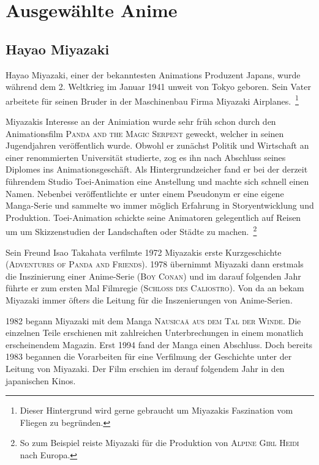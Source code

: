 \newpage
\section{Ausgewählte Anime}


\subsection{Hayao Miyazaki}
Hayao Miyazaki, einer der bekanntesten Animations Produzent Japans, wurde während dem 2. Weltkrieg im Januar 1941 unweit von Tokyo geboren. Sein Vater arbeitete für seinen Bruder in der Maschinenbau Firma Miyazaki Airplanes.~\footnote{Dieser Hintergrund wird gerne gebraucht um Miyazakis Faszination vom Fliegen zu begründen.} 

Miyazakis Interesse an der Animiation wurde sehr früh schon durch den Animationsfilm \textsc{Panda and the Magic Serpent} geweckt, welcher in seinen Jugendjahren veröffentlich wurde. Obwohl er zunächst Politik und Wirtschaft an einer renommierten Universität studierte, zog es ihn nach Abschluss seines Diplomes ins Animationsgeschäft. Als Hintergrundzeicher fand er bei der derzeit führendem Studio Toei-Animation eine Anstellung und machte sich schnell einen Namen. Nebenbei veröffentlichte er unter einem Pseudonym er eine eigene Manga-Serie und sammelte wo immer möglich Erfahrung in Storyentwicklung und Produktion. Toei-Animation schickte seine Animatoren gelegentlich auf Reisen um um Skizzenstudien der Landschaften oder Städte zu machen.~\footnote{So zum Beispiel reiste Miyazaki für die Produktion von \textsc{Alpine Girl Heidi} nach Europa.} 

Sein Freund Isao Takahata verfilmte 1972 Miyazakis erste Kurzgeschichte (\textsc{Adventures of Panda and Friends}). 1978 übernimmt Miyazaki dann erstmals die Inszinierung einer Anime-Serie (\textsc{Boy Conan}) und im darauf folgenden Jahr führte er zum ersten Mal Filmregie (\textsc{Schloss des Caliostro}). Von da an bekam Miyazaki immer öfters die Leitung für die Inszenierungen von Anime-Serien.

1982 begann Miyazaki mit dem Manga \textsc{Nausicaä aus dem Tal der Winde}. Die einzelnen Teile erschienen mit zahlreichen Unterbrechungen in einem monatlich erscheinendem Magazin. Erst 1994 fand der Manga einen Abschluss. Doch bereits 1983 begannen die Vorarbeiten für eine Verfilmung der Geschichte unter der Leitung von Miyazaki. Der Film erschien im derauf folgendem Jahr in den japanischen Kinos. 

